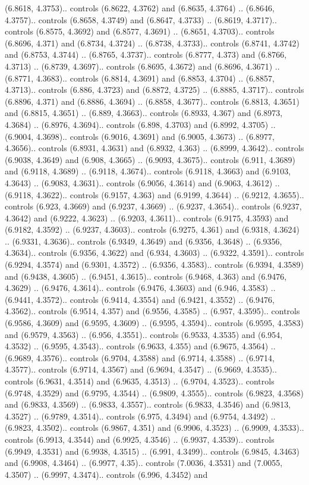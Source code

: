(6.8618, 4.3753).. controls (6.8622, 4.3762) and (6.8635, 4.3764) .. (6.8646, 4.3757).. controls (6.8658, 4.3749) and (6.8647, 4.3733) .. (6.8619, 4.3717).. controls (6.8575, 4.3692) and (6.8577, 4.3691) .. (6.8651, 4.3703).. controls (6.8696, 4.371) and (6.8734, 4.3724) .. (6.8738, 4.3733).. controls (6.8741, 4.3742) and (6.8753, 4.3744) .. (6.8765, 4.3737).. controls (6.8777, 4.373) and (6.8766, 4.3713) .. (6.8739, 4.3697).. controls (6.8695, 4.3672) and (6.8696, 4.3671) .. (6.8771, 4.3683).. controls (6.8814, 4.3691) and (6.8853, 4.3704) .. (6.8857, 4.3713).. controls (6.886, 4.3723) and (6.8872, 4.3725) .. (6.8885, 4.3717).. controls (6.8896, 4.371) and (6.8886, 4.3694) .. (6.8858, 4.3677).. controls (6.8813, 4.3651) and (6.8815, 4.3651) .. (6.889, 4.3663).. controls (6.8933, 4.367) and (6.8973, 4.3684) .. (6.8976, 4.3694).. controls (6.898, 4.3703) and (6.8992, 4.3705) .. (6.9004, 4.3698).. controls (6.9016, 4.3691) and (6.9005, 4.3673) .. (6.8977, 4.3656).. controls (6.8931, 4.3631) and (6.8932, 4.363) .. (6.8999, 4.3642).. controls (6.9038, 4.3649) and (6.908, 4.3665) .. (6.9093, 4.3675).. controls (6.911, 4.3689) and (6.9118, 4.3689) .. (6.9118, 4.3674).. controls (6.9118, 4.3663) and (6.9103, 4.3643) .. (6.9083, 4.3631).. controls (6.9056, 4.3614) and (6.9063, 4.3612) .. (6.9118, 4.3622).. controls (6.9157, 4.363) and (6.9199, 4.3644) .. (6.9212, 4.3655).. controls (6.923, 4.3669) and (6.9237, 4.3669) .. (6.9237, 4.3654).. controls (6.9237, 4.3642) and (6.9222, 4.3623) .. (6.9203, 4.3611).. controls (6.9175, 4.3593) and (6.9182, 4.3592) .. (6.9237, 4.3603).. controls (6.9275, 4.361) and (6.9318, 4.3624) .. (6.9331, 4.3636).. controls (6.9349, 4.3649) and (6.9356, 4.3648) .. (6.9356, 4.3634).. controls (6.9356, 4.3622) and (6.934, 4.3603) .. (6.9322, 4.3591).. controls (6.9294, 4.3574) and (6.9301, 4.3572) .. (6.9356, 4.3583).. controls (6.9394, 4.3589) and (6.9438, 4.3605) .. (6.9451, 4.3615).. controls (6.9468, 4.363) and (6.9476, 4.3629) .. (6.9476, 4.3614).. controls (6.9476, 4.3603) and (6.946, 4.3583) .. (6.9441, 4.3572).. controls (6.9414, 4.3554) and (6.9421, 4.3552) .. (6.9476, 4.3562).. controls (6.9514, 4.357) and (6.9556, 4.3585) .. (6.957, 4.3595).. controls (6.9586, 4.3609) and (6.9595, 4.3609) .. (6.9595, 4.3594).. controls (6.9595, 4.3583) and (6.9579, 4.3563) .. (6.956, 4.3551).. controls (6.9533, 4.3535) and (6.954, 4.3532) .. (6.9595, 4.3543).. controls (6.9633, 4.355) and (6.9675, 4.3564) .. (6.9689, 4.3576).. controls (6.9704, 4.3588) and (6.9714, 4.3588) .. (6.9714, 4.3577).. controls (6.9714, 4.3567) and (6.9694, 4.3547) .. (6.9669, 4.3535).. controls (6.9631, 4.3514) and (6.9635, 4.3513) .. (6.9704, 4.3523).. controls (6.9748, 4.3529) and (6.9795, 4.3544) .. (6.9809, 4.3555).. controls (6.9823, 4.3568) and (6.9833, 4.3569) .. (6.9833, 4.3557).. controls (6.9833, 4.3546) and (6.9813, 4.3527) .. (6.9789, 4.3514).. controls (6.975, 4.3494) and (6.9754, 4.3492) .. (6.9823, 4.3502).. controls (6.9867, 4.351) and (6.9906, 4.3523) .. (6.9909, 4.3533).. controls (6.9913, 4.3544) and (6.9925, 4.3546) .. (6.9937, 4.3539).. controls (6.9949, 4.3531) and (6.9938, 4.3515) .. (6.991, 4.3499).. controls (6.9845, 4.3463) and (6.9908, 4.3464) .. (6.9977, 4.35).. controls (7.0036, 4.3531) and (7.0055, 4.3507) .. (6.9997, 4.3474).. controls (6.996, 4.3452) and 